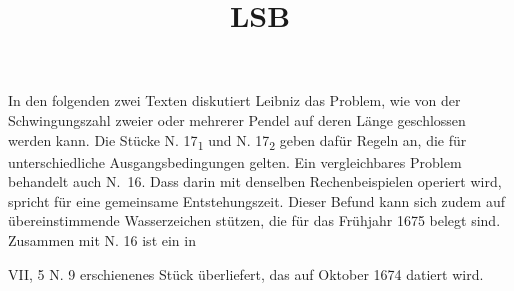 \vspace*{8mm}
\pstart 
\footnotesize
\noindent In den folgenden zwei Texten diskutiert Leibniz das Problem, wie von der Schwingungs\-zahl zweier oder mehrerer Pendel auf deren L\"{a}nge geschlossen werden kann. Die St\"{u}cke N. 17\textsubscript{1} und N. 17\textsubscript{2} geben daf\"{u}r Regeln an, die f\"{u}r unter\-schiedliche Ausgangsbedingungen gelten. Ein vergleichba\-res Problem behandelt auch N.~16.
Dass darin mit denselben Rechenbeispielen operiert wird, spricht f\"{u}r eine gemeinsame Ent\-stehungs\-zeit. Dieser Befund kann sich zudem auf \"{u}bereinstimmende Wasserzeichen  st\"{u}tzen, die für das Frühjahr 1675 belegt sind. 
Zusammen mit N. 16
ist ein in \cite{00115}\title{LSB} VII, 5 N. 9 erschienenes Stück überliefert, das auf Oktober 1674 datiert wird. 
\pend
 
 

